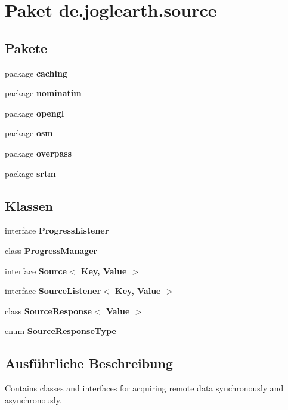 \section{Paket de.\-joglearth.\-source}
\label{namespacede_1_1joglearth_1_1source}
\subsection*{Pakete}
\begin{DoxyCompactItemize}
\item 
package {\bf caching}
\item 
package {\bf nominatim}
\item 
package {\bf opengl}
\item 
package {\bf osm}
\item 
package {\bf overpass}
\item 
package {\bf srtm}
\end{DoxyCompactItemize}
\subsection*{Klassen}
\begin{DoxyCompactItemize}
\item 
interface {\bf Progress\-Listener}
\item 
class {\bf Progress\-Manager}
\item 
interface {\bf Source$<$ Key, Value $>$}
\item 
interface {\bf Source\-Listener$<$ Key, Value $>$}
\item 
class {\bf Source\-Response$<$ Value $>$}
\item 
enum {\bf Source\-Response\-Type}
\end{DoxyCompactItemize}


\subsection{Ausführliche Beschreibung}
Contains classes and interfaces for acquiring remote data synchronously and asynchronously. 